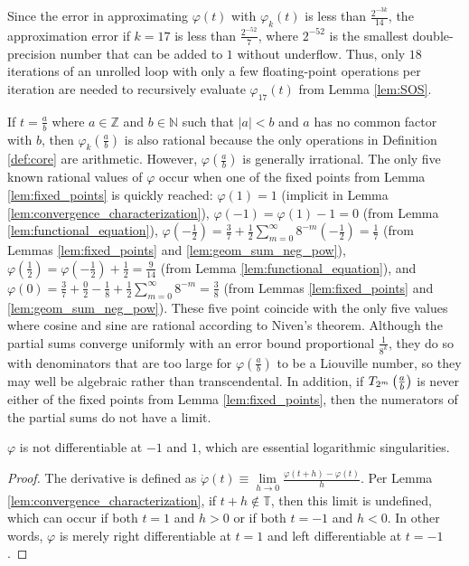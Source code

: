 \begin{remark*}
Since the error in approximating $\varphi\left(t\right)$ with $\varphi_k\left(t\right)$ is less than $\frac{2^{-3k}}{14}$, the approximation error if $k = 17$ is less than $\frac{2^{-52}}{7}$, where $2^{-52}$ is the smallest double-precision number that can be added to $1$ without underflow. Thus, only $18$ iterations of an unrolled loop with only a few floating-point operations per iteration are needed to recursively evaluate $\varphi_{17}\left(t\right)$ from Lemma \ref{lem:SOS}.
\end{remark*}
\begin{remark*}
  If $t = \frac{a}{b}$ where $a \in \mathbb{Z}$ and $b \in \mathbb{N}$ such that $\left|a\right| < b$ and $a$ has no common factor with $b$, then $\varphi_k\left(\frac{a}{b}\right)$ is also rational because the only operations in Definition \ref{def:core} are arithmetic. However, $\varphi\left(\frac{a}{b}\right)$ is generally irrational. The only five known rational values of $\varphi$ occur when one of the fixed points from Lemma \ref{lem:fixed_points} is quickly reached: $\varphi\left(1\right) = 1$ (implicit in Lemma \ref{lem:convergence_characterization}), $\varphi\left(-1\right) = \varphi\left(1\right) - 1 = 0$ (from Lemma \ref{lem:functional_equation}), $\varphi\left(-\frac{1}{2}\right) = \frac{3}{7} + \frac{1}{2} \sum\limits_{m = 0}^\infty 8^{-m} \left(-\frac{1}{2}\right) = \frac{1}{7}$ (from Lemmas \ref{lem:fixed_points} and \ref{lem:geom_sum_neg_pow}), $\varphi\left(\frac{1}{2}\right) = \varphi\left(-\frac{1}{2}\right) + \frac{1}{2} = \frac{9}{14}$ (from Lemma \ref{lem:functional_equation}), and $\varphi\left(0\right) = \frac{3}{7} + \frac{0}{2} - \frac{1}{8} + \frac{1}{2} \sum\limits_{m = 0}^\infty 8^{-m} = \frac{3}{8}$ (from Lemmas \ref{lem:fixed_points} and \ref{lem:geom_sum_neg_pow}). These five point coincide with the only five values where cosine and sine are rational according to Niven's theorem. Although the partial sums converge uniformly with an error bound proportional $\frac{1}{8^{k}}$, they do so with denominators that are too large for $\varphi\left(\frac{a}{b}\right)$ to be a Liouville number, so they may well be algebraic rather than transcendental. In addition, if $\TT[\frac{a}{b}]{m}$ is never either of the fixed points from Lemma \ref{lem:fixed_points}, then the numerators of the partial sums do not have a limit.
\end{remark*}

\begin{lemma}
  \label{lem:endpoint_singularities}
  $\varphi$ is not differentiable at $-1$ and $1$, which are essential logarithmic singularities.
\end{lemma}
\begin{proof}
  The derivative is defined as $\dot{\varphi}\left(t\right) \equiv \lim\limits_{h \rightarrow 0} \frac{\varphi\left(t + h\right) - \varphi\left(t\right)}{h}$. Per Lemma \ref{lem:convergence_characterization}, if $t + h \notin \mathbb{T}$, then this limit is undefined, which can occur if both $t = 1$ and $h > 0$ or if both $t = -1$ and $h < 0$. In other words, $\varphi$ is merely right differentiable at $t = 1$ and left differentiable at $t = -1$.
\end{proof}


